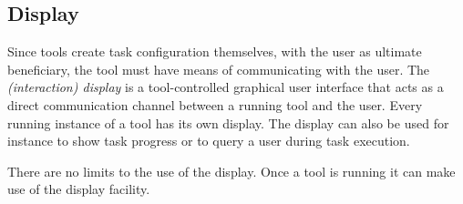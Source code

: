 \documentclass{article}
\begin{document}

  \subsection{Display}

   Since tools create task configuration themselves, with the user as ultimate
   beneficiary, the tool must have means of communicating with the user. The
   \textit{(interaction) display} is a tool-controlled graphical user interface
   that acts as a direct communication channel between a running tool and the
   user. Every running instance of a tool has its own display. The display can
   also be used for instance to show task progress or to query a user during
   task execution.

   There are no limits to the use of the display. Once a tool is running it can
   make use of the display facility.


\end{document}

